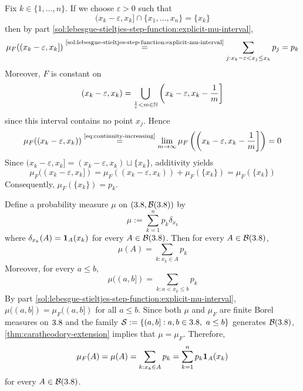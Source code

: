 \begin{solution}
\begin{enumerate}[label={\protect\hyperref[exitem:lebesgue-stieltjes-step-function:\arabic*]{(\alph*)}}]
\item \label{solitem:lebesgue-stieltjes-step-function:3}
Fix $k \in \{1,\dots,n\}$. 
If we choose $\varepsilon>0$ such that
\[
(x_k-\varepsilon,x_k] \cap \{x_1,\dots,x_n\} = \{x_k\}
\]
then by part \ref{sol:lebesgue-stieltjes-step-function:explicit-mu-interval},
\[
\mu_F((x_k-\varepsilon,x_k]) \overset{\text{\ref{sol:lebesgue-stieltjes-step-function:explicit-mu-interval}}}= \sum_{j: x_k-\varepsilon < x_j \le x_k} p_j = p_k
\]
Moreover, $F$ is constant on 
\[
(x_k-\varepsilon,x_k) = \bigcup_{\frac{1}{\varepsilon} < m \in \mathbb{N}} \left(x_k-\varepsilon, x_k - \frac{1}{m}\right]
\]
since this interval contains no point $x_j$. 
Hence
\[
\mu_F((x_k-\varepsilon,x_k)) 
\overset{\text{\eqref{eq:continuity-increasing}}}{=}
\lim_{m\to\infty} \mu_F\left(\left(x_k-\varepsilon, x_k - \frac{1}{m}\right]\right)
=
0
\]
Since
\((x_k-\varepsilon,x_k] = (x_k-\varepsilon,x_k) \sqcup \{x_k\}\),
additivity yields
\[
\mu_F((x_k-\varepsilon,x_k])
=
\mu_F((x_k-\varepsilon,x_k)) + \mu_F(\{x_k\})
=
\mu_F(\{x_k\})
\]
Consequently, $\mu_F(\{x_k\})=p_k$.

\item \label{solitem:lebesgue-stieltjes-step-function:4}
\label{sol:lebesgue-stieltjes-step-function:explicit-mu-set}
Define a probability measure $\mu$ on $(3.8,\mathcal{B}(3.8))$ by
\[
\mu := \sum_{k=1}^n p_k\delta_{x_k}
\]
where 
$\delta_{x_k}(A) = \mathbf{1}_A(x_k)$ for every 
 $A \allowbreak \in \allowbreak \mathcal{B}(3.8)$.
Then for every $A \in \mathcal{B}(3.8)$,
\[
\mu(A)=\sum_{k : x_k\in A} p_k
\]
Moreover, for every $a \le b$,
\[\mu((a,b]) = \sum_{k: a < x_k \le b} p_k\]
By part \ref{sol:lebesgue-stieltjes-step-function:explicit-mu-interval},
\(\mu((a,b]) = \mu_F((a,b])\)
for all $a \le b$.
Since both $\mu$ and $\mu_F$ are finite Borel measures on $3.8$ and the family
\(\mathcal{S} := \{(a,b] : a,b \in 3.8,\ a \le b\}\)
generates $\mathcal{B}(3.8)$, 
\autoref{thm:caratheodory-extension}
implies that $\mu=\mu_F$. 
Therefore, 
\[
\mu_F(A)=\mu(A)=\sum_{k : x_k\in A} p_k = \sum_{k=1}^n p_k\mathbf{1}_A(x_k)
\]
for every $A \in \mathcal{B}(3.8)$.


\end{enumerate}
\end{solution}
